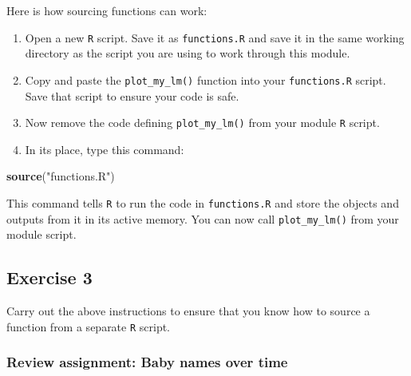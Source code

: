 \documentclass[
]{book}
\newenvironment{Shaded}{\begin{snugshade}}{\end{snugshade}}
\newcommand{\KeywordTok}[1]{\textcolor[rgb]{0.13,0.29,0.53}{\textbf{#1}}}
\newcommand{\NormalTok}[1]{#1}
\newcommand{\StringTok}[1]{\textcolor[rgb]{0.31,0.60,0.02}{#1}}
\begin{document}
Here is how sourcing functions can work:

\begin{enumerate}
\def\labelenumi{\arabic{enumi}.}
\item
  Open a new \texttt{R} script. Save it as \texttt{functions.R} and save it in the same working directory as the script you are using to work through this module.
\item
  Copy and paste the \texttt{plot\_my\_lm()} function into your \texttt{functions.R} script. Save that script to ensure your code is safe.
\item
  Now remove the code defining \texttt{plot\_my\_lm()} from your module \texttt{R} script.
\item
  In its place, type this command:
\end{enumerate}

\begin{Shaded}
\begin{Highlighting}[]
\KeywordTok{source}\NormalTok{(}\StringTok{"functions.R"}\NormalTok{)}
\end{Highlighting}
\end{Shaded}

This command tells \texttt{R} to run the code in \texttt{functions.R} and store the objects and outputs from it in its active memory. You can now call \texttt{plot\_my\_lm()} from your module script.

\hypertarget{exercise-3-2}{%
\subsection*{Exercise 3}\label{exercise-3-2}}

Carry out the above instructions to ensure that you know how to source a function from a separate \texttt{R} script.

\hypertarget{review-assignment-baby-names-over-time}{%
\subsubsection*{Review assignment: Baby names over time}\label{review-assignment-baby-names-over-time}}
\end{document}
